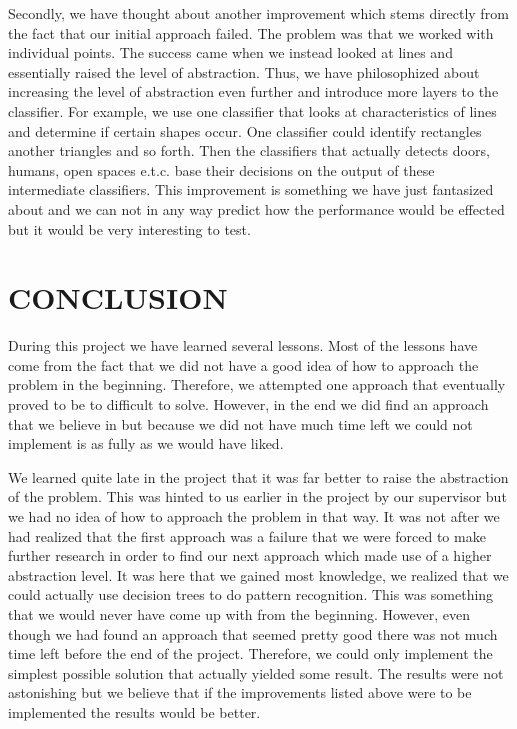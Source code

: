 \documentclass[a4paper, 10pt, conference]{ieeeconf}      %
\begin{document}
Secondly, we have thought about another improvement which stems directly from the fact that our initial approach failed. The problem was that we worked with individual points. The success came when we instead looked at lines and essentially raised the level of abstraction. Thus, we have philosophized about increasing the level of abstraction even further and introduce more layers to the classifier. For example, we use one classifier that looks at characteristics of lines and determine if certain shapes occur. One classifier could identify rectangles another triangles and so forth. Then the classifiers that actually detects doors, humans, open spaces e.t.c. base their decisions  on the output of these intermediate classifiers. This improvement is something we have just fantasized about and we can not in any way predict how the performance would be effected but it would be very interesting to test.

\section{CONCLUSION}
During this project we have learned several lessons. Most of the lessons have come from the fact that we did not have a good idea of how to approach the problem in the beginning. Therefore, we attempted one approach that eventually proved to be to difficult to solve. However, in the end we did find an approach that we believe in but because we did not have much time left we could not implement is as fully as we would have liked.

We learned quite late in the project that it was far better to raise the abstraction of the problem. This was hinted to us earlier in the project by our supervisor but we had no idea of how to approach the problem in that way. It was not after we had realized that the first approach was a failure that we were forced to make further research in order to find our next approach which made use of a higher abstraction level. It was here that we gained most knowledge, we realized that we could actually use decision trees to do pattern recognition. This was something that we would never have come up with from the beginning. However, even though we had found an approach that seemed pretty good there was not much time left before the end of the project. Therefore, we could only implement the simplest possible solution that actually yielded some result. The results were not astonishing but we believe that if the improvements listed above were to be implemented the results would be better.
\end{document}
